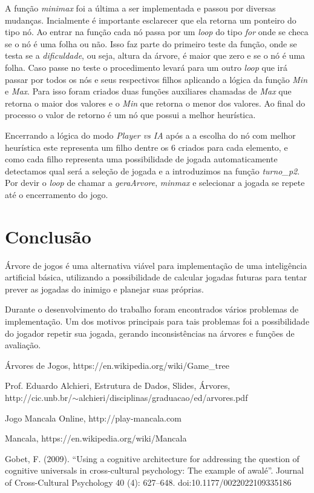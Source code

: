 \documentclass[a4paper, 12pt]{article}
\begin{document}
		A função \emph{minimax} foi a última a ser implementada e passou por diversas mudanças. Incialmente é importante esclarecer que ela retorna um ponteiro do tipo nó. Ao entrar na função cada nó passa por um \emph{loop} do tipo \emph{for} onde se checa se o nó é uma folha ou não. Isso faz parte do primeiro teste da função, onde se testa se a \emph{dificuldade}, ou seja,  altura da árvore, é maior que zero e se o nó é uma folha. Caso passe no teste o procedimento levará para um outro \emph{loop} que irá passar por todos os nós e seus respectivos filhos aplicando a lógica da função \emph{Min} e \emph{Max}. Para isso foram criados duas funções auxiliares chamadas de \emph{Max} que retorna o maior dos valores e o \emph{Min} que retorna o menor dos valores. Ao final do processo o valor de retorno é um nó que possui a melhor heurística.

		Encerrando a lógica do modo \emph{Player vs IA} após a a escolha do nó com melhor heurística este representa um filho dentre os 6 criados para cada elemento, e como cada filho representa uma possibilidade de jogada automaticamente detectamos qual será a seleção de jogada e a introduzimos na função \emph{turno\_p2}. Por devir o \emph{loop} de chamar a \emph{geraArvore}, \emph{minmax} e selecionar a jogada se repete até o encerramento do jogo.

	\section{Conclusão}

		Árvore de jogos é uma alternativa viável para implementação de uma inteligência artificial básica, utilizando a possibilidade de calcular jogadas futuras para tentar prever as jogadas do inimigo e planejar suas próprias.

		Durante o desenvolvimento do trabalho foram encontrados vários problemas de implementação. Um dos motivos principais para tais problemas foi a possibilidade do jogador repetir sua jogada, gerando inconsistências na árvores e funções de avaliação.

	\begin{thebibliography}{9}

	    Árvores de Jogos, https://en.wikipedia.org/wiki/Game\_tree

		Prof. Eduardo Alchieri, Estrutura de Dados, Slides, Árvores,\\ http://cic.unb.br/$\sim$alchieri/disciplinas/graduacao/ed/arvores.pdf

		Jogo Mancala Online, http://play-mancala.com

		Mancala, https://en.wikipedia.org/wiki/Mancala

		Gobet, F. (2009). ``Using a cognitive architecture for addressing the question of cognitive universals in cross-cultural psychology: The example of awalé''. Journal of Cross-Cultural Psychology 40 (4): 627–648. doi:10.1177/0022022109335186

	\end{thebibliography}
\end{document}
